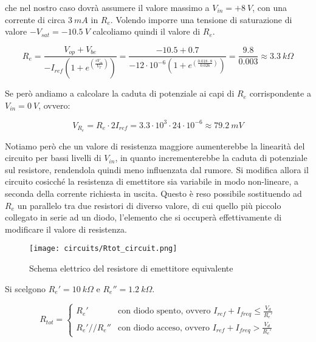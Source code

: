 che nel nostro caso dovrà assumere il valore massimo a $V_{in}=+8\ V$, con una corrente di
circa $3\ mA$  in $R_e$. Volendo imporre una tensione di saturazione di valore
$-V_{sat}=-10.5\ V$ calcoliamo quindi il valore di $R_e$.

\begin{equation}
    R_e=\frac{V_{op}+V_{be}}{-I_{ref}\left(1+e^{\left(\frac{sV_{in}}{V_T}\right)}\right)}=
    \frac{-10.5+0.7}{-12\cdot10^{-6}\left(1+e^{\left(\frac{0.018\cdot8}{0.026}\right)}\right)}=
    \frac{9.8}{0.003}\approx 3.3\ k\Omega
\end{equation}

Se però andiamo a calcolare la caduta di potenziale ai capi di $R_e$ corrispondente a $V_{in}=0\ V$,
ovvero:

\begin{equation}\label{vre}
    V_{R_e}=R_e\cdot 2I_{ref}=3.3\cdot10^3\cdot24\cdot10^{-6}\approx79.2\ mV
\end{equation}

Notiamo però che un valore di resistenza maggiore aumenterebbe la linearità del circuito per
bassi livelli di $V_{in}$, in quanto incrementerebbe la caduta di potenziale sul resistore,
rendendola quindi meno influenzata dal rumore. Si modifica allora il circuito cosicché la
resistenza di emettitore sia variabile in modo non-lineare, a seconda della corrente richiesta
in uscita. Questo è reso possibile sostituendo ad $R_e$ un parallelo tra due resistori di
diverso valore, di cui quello più piccolo collegato in serie ad un diodo, l'elemento che si
occuperà effettivamente di modificare il valore di resistenza.

\begin{figure}[H]
    \centering
    \texttt{[image: circuits/Rtot\_circuit.png]}
    \caption{Schema elettrico del resistore di emettitore equivalente}
    \label{Rtot_circuit}
\end{figure}

Si scelgono $R_e'=10\ k\Omega$ e $R_e''=1.2\ k\Omega$.

\begin{equation}\label{rtot}
    R_{tot} =
    \left\{
    \begin{array}{lr}
        R_e'        & \text{con diodo spento, ovvero } I_{ref}+I_{freq}\leq\frac{V_d}{R_e'} \\
        R_e'//R_e'' & \text{con diodo acceso, ovvero } I_{ref}+I_{freq}>\frac{V_d}{R_e'}
    \end{array}
    \right.
\end{equation}

